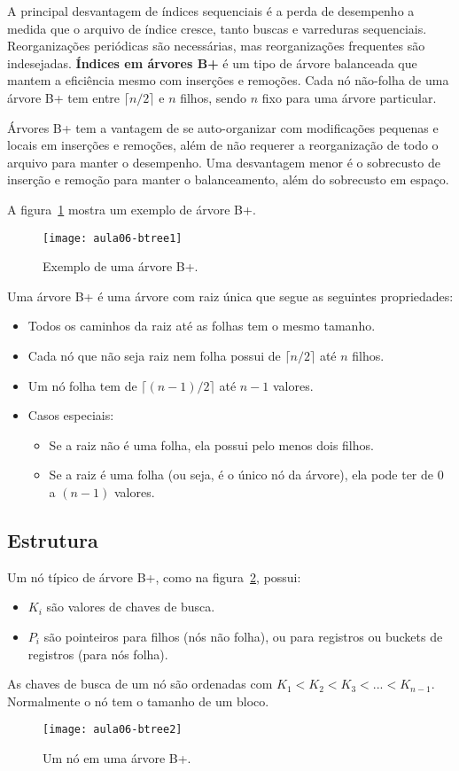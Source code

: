 A principal desvantagem de índices sequenciais é a perda de desempenho
a medida que o arquivo de índice cresce, tanto buscas e varreduras sequenciais.
Reorganizações periódicas são necessárias, mas reorganizações frequentes
são indesejadas.
\textbf{Índices em árvores B+} é um tipo de árvore balanceada que mantem a eficiência
mesmo com inserções e remoções.
Cada nó não-folha de uma árvore B+ tem entre $\lceil n/2 \rceil$ e $n$ filhos,
sendo $n$ fixo para uma árvore particular.

Árvores B+ tem a vantagem de se auto-organizar com modificações pequenas e
locais em inserções e remoções, além de não requerer a reorganização de todo o
arquivo para manter o desempenho.
Uma desvantagem menor é o sobrecusto de inserção e remoção para manter o 
balanceamento, além do sobrecusto em espaço.

A figura~\ref{aula06:fig:btree1} mostra um exemplo de árvore B+.
%
\begin{figure}[!htb]
\centering
\texttt{[image: aula06-btree1]}
\caption{Exemplo de uma árvore B+.}
\label{aula06:fig:btree1}
\end{figure}

Uma árvore B+ é uma árvore com raiz única que segue as seguintes propriedades:
\begin{itemize}
\item Todos os caminhos da raiz até as folhas tem o mesmo tamanho.
\item Cada nó que não seja raiz nem folha possui de $\lceil n/2 \rceil$
até $n$ filhos.
\item Um nó folha tem de $\lceil (n-1)/2 \rceil$ até $n-1$ valores.
\item Casos especiais:
	\begin{itemize}
	\item Se a raiz não é uma folha, ela possui pelo menos dois filhos.
	\item Se a raiz é uma folha (ou seja, é o único nó da árvore), ela
	pode ter de $0$ a $(n-1)$ valores.
	\end{itemize}
\end{itemize}

\subsection{Estrutura}

Um nó típico de árvore B+, como na figura~\ref{aula06:fig:btree2}, possui:
\begin{itemize}
\item $K_i$ são valores de chaves de busca.
\item $P_i$ são pointeiros para filhos (nós não folha), ou para
registros ou buckets de registros (para nós folha).
\end{itemize}
As chaves de busca de um nó são ordenadas com $K_1 < K_2 < K_3 < ... < K_{n-1}$.
Normalmente o nó tem o tamanho de um bloco.
%
\begin{figure}[!htb]
\centering
\texttt{[image: aula06-btree2]}
\caption{Um nó em uma árvore B+.}
\label{aula06:fig:btree2}
\end{figure}

